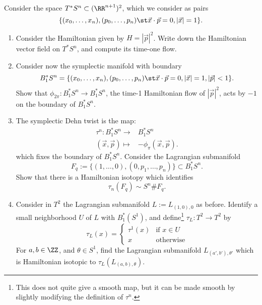 
 
 
Consider the space $T^*S^n\subset (\RR^{n+1})^2$, which we consider as pairs \[\{(x_0, \ldots, x_n), (p_0, \ldots, p_n) \st\vec x\cdot \vec p=0, |\vec x|=1 \}.\] 
\begin{enumerate}
    \item Consider the Hamiltonian given by $H=|\vec p|^2$. Write down the Hamiltonian vector field on $T^*S^n$, and compute its time-one flow.
    \item Consider now the symplectic manifold with boundary 
    \[B^*_1S^n=\{(x_0, \ldots, x_n), (p_0, \ldots, p_n) \st\vec x\cdot \vec p =0,|\vec x|=1, |\vec p|<1\}.\]
    Show that $\phi_{2\pi}: B^*_1S^n\to B^*_1 S^n$, the time-1 Hamiltonian flow of $|\vec p|^2$, acts by  $-1$ on the boundary of $B^*_1S^n$. 
    \item The symplectic Dehn twist is the map: 
    \begin{align*}
        \tau^n: B^*_1 S^n\to& B^*_1 S^n\\
            (\vec x, \vec p) \mapsto& -\phi_{\pi}(\vec x, \vec p).
    \end{align*}
    which fixes the boundary of $B^*_1 S^n$.
    Consider the Lagrangian submanifold  
    \[F_q:=\{(1, \ldots, 0), (0, p_1, \ldots, p_n)\}\subset B^*_1S^n.\]
    Show that there is a Hamiltonian isotopy which identifies
    \[\tau_n(F_q)\sim S^n\# F_q.\]
    \item Consider in $T^2$ the Lagrangian submanifold $L:=L_{(1, 0),0}$ as before. Identify a small neighborhood $U$ of $L$ with $B^*_1(S^1)$, and define\footnote{This does not quite give a smooth map, but it can be made smooth by slightly modifying the definition of $\tau^n$.} $\tau_L: T^2\to T^2$ by 
    \[\tau_L(x)=\left\{\begin{array}{cc} \tau^1(x) &\text{if $x\in U$}\\
        x &\text{otherwise}\end{array}\right.\]
    For $a, b\in \ZZ$, and $\theta\in S^1$, find the Lagrangian submanifold $L_{(a', b'), \theta'}$ which is Hamiltonian isotopic to  $\tau_L(L_{(a, b), \theta})$.
\end{enumerate}

 